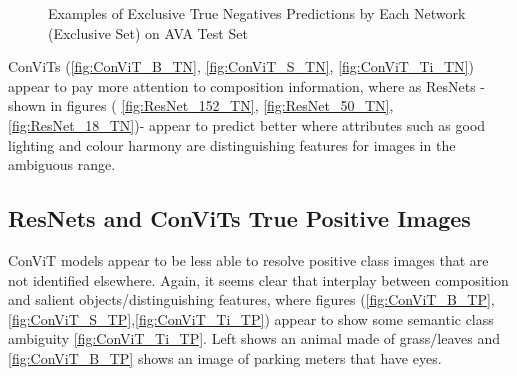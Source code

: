 \begin{figure}[ht!]
    \caption{Examples of Exclusive True Negatives Predictions by Each Network (Exclusive Set) on AVA Test Set}
    \label{fig:true_negative}
\end{figure}

ConViTs (\ref{fig:ConViT_B_TN}, \ref{fig:ConViT_S_TN}, \ref{fig:ConViT_Ti_TN}) appear to pay more attention to composition information, where as ResNets - shown in figures ( \ref{fig:ResNet_152_TN}, \ref{fig:ResNet_50_TN}, \ref{fig:ResNet_18_TN})- appear to predict better where attributes such as good lighting and colour harmony are distinguishing features for images in the ambiguous range.

\subsection{ResNets and ConViTs True Positive Images}
\label{qualitative positives}

ConViT models appear to be less able to resolve positive class images that are not identified elsewhere. Again, it seems clear that interplay between composition and salient objects/distinguishing features, where figures (\ref{fig:ConViT_B_TP}, \ref{fig:ConViT_S_TP},\ref{fig:ConViT_Ti_TP}) appear to show some semantic class ambiguity \ref{fig:ConViT_Ti_TP}. Left shows an animal made of grass/leaves and \ref{fig:ConViT_B_TP} shows an image of parking meters that have eyes.


